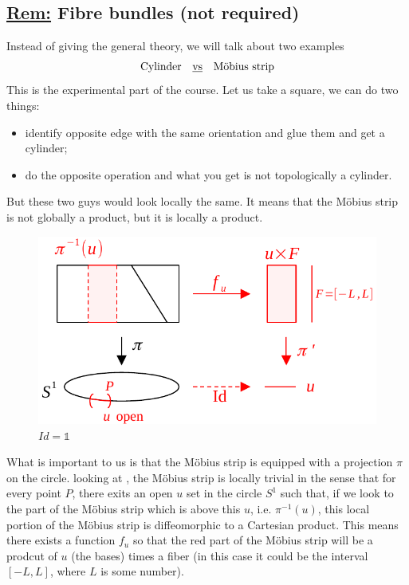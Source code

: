\documentclass[../main.tex]{subfiles}
\begin{document}
\subsection[Fibre bundles]{\underline{Rem:} Fibre bundles (not required)}
Instead of giving the general theory, we will talk about two examples
\[
\textrm{Cylinder} \quad \textrm{\underline{vs}} \quad \textrm{Möbius strip}
\]
This is the experimental part of the course. Let us take a square, we can do two things:
\begin{itemize}
    \item identify opposite edge with the same orientation and glue them and get a cylinder;
    \item do the opposite operation and what you get is not topologically a cylinder.
\end{itemize}
But these two guys would look locally the same. It means that the Möbius strip is not globally a product, but it is locally a product. 
\begin{figure}[H]
	\includegraphics{images/Fiber_bundles.pdf}
	\caption[Fiber Bundles]{$Id=\mathbb{1}$}
\end{figure}
What is important to us is that the Möbius strip is equipped with a projection $\pi$ on the circle. looking at , the Möbius strip is locally trivial in the sense that for every point $P$, there exits an open $u$ set in the circle $S^1$ such that, if we look to the part of the Möbius strip which is above this $u$, i.e. $\pi^{-1}(u)$, this local portion of the Möbius strip is diffeomorphic to a Cartesian product. This means there exists a function $f_u$ so that the red part of the Möbius strip will be a prodcut of $u$ (the bases) times a fiber (in this case it could be the interval $\left[-L,L\right]$, where $L$ is some number).
\end{document}
